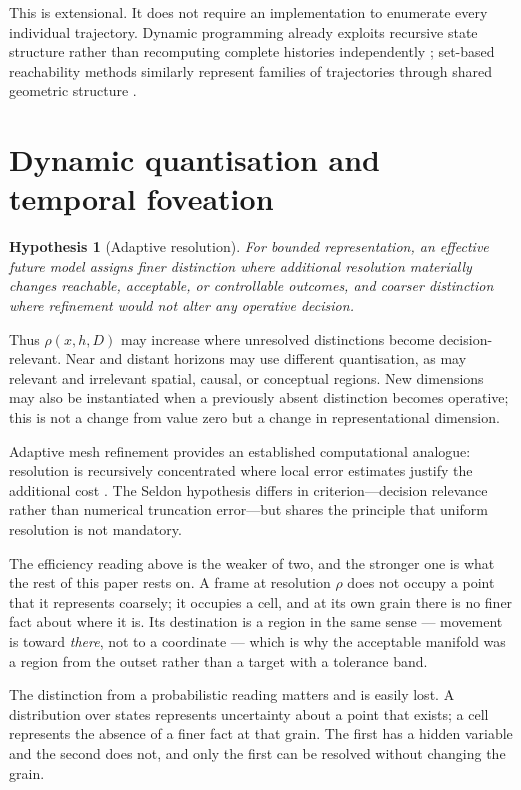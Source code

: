 \documentclass[11pt,a4paper]{article}
\newtheorem{hypothesis}[definition]{Hypothesis}
\theoremstyle{remark}
\begin{document}
This is extensional. It does not require an implementation to enumerate every individual trajectory. Dynamic programming already exploits recursive state structure rather than recomputing complete histories independently \citep{bellman1957}; set-based reachability methods similarly represent families of trajectories through shared geometric structure \citep{mitchell2005,bansal2017}.

\section{Dynamic quantisation and temporal foveation}\label{sec:foveation}

\begin{hypothesis}[Adaptive resolution]\label{hyp:adaptive-resolution}
For bounded representation, an effective future model assigns finer distinction where additional resolution materially changes reachable, acceptable, or controllable outcomes, and coarser distinction where refinement would not alter any operative decision.
\end{hypothesis}

Thus $\rho(x,h,D)$ may increase where unresolved distinctions become decision-relevant. Near and distant horizons may use different quantisation, as may relevant and irrelevant spatial, causal, or conceptual regions. New dimensions may also be instantiated when a previously absent distinction becomes operative; this is not a change from value zero but a change in representational dimension.

Adaptive mesh refinement provides an established computational analogue: resolution is recursively concentrated where local error estimates justify the additional cost \citep{berger1984}. The Seldon hypothesis differs in criterion---decision relevance rather than numerical truncation error---but shares the principle that uniform resolution is not mandatory.

The efficiency reading above is the weaker of two, and the stronger one is what the rest of this
paper rests on. A frame at resolution $\rho$ does not occupy a point that it represents coarsely; it
occupies a cell, and at its own grain there is no finer fact about where it is. Its destination is a
region in the same sense --- movement is toward \emph{there}, not to a coordinate --- which is why
the acceptable manifold was a region from the outset rather than a target with a tolerance band.

The distinction from a probabilistic reading matters and is easily lost. A distribution over states
represents uncertainty about a point that exists; a cell represents the absence of a finer fact at
that grain. The first has a hidden variable and the second does not, and only the first can be
resolved without changing the grain.
\end{document}
